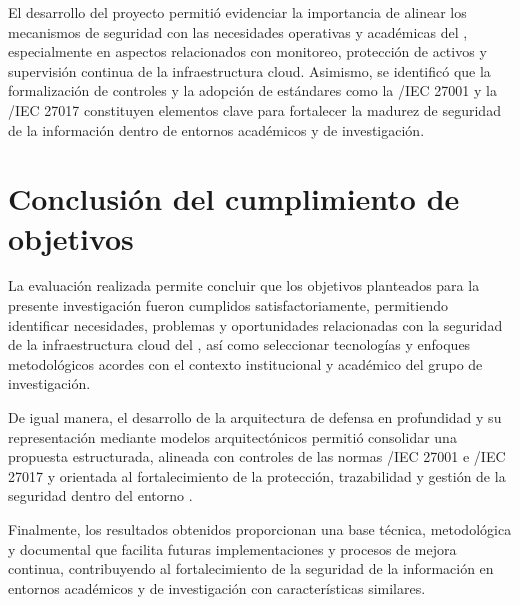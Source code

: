 El desarrollo del proyecto permitió evidenciar la importancia de alinear los mecanismos de seguridad con las necesidades operativas y 
académicas del \GRID, especialmente en aspectos relacionados con monitoreo, protección de activos y supervisión continua de la 
infraestructura cloud. Asimismo, se identificó que la formalización de controles y la adopción de estándares como la \ISO/IEC 27001 y la 
\ISO/IEC 27017 constituyen elementos clave para fortalecer la madurez de seguridad de la información dentro de entornos académicos y de 
investigación.

\section{Conclusión del cumplimiento de objetivos}
\noindent

La evaluación realizada permite concluir que los objetivos planteados para la presente investigación fueron cumplidos satisfactoriamente, 
permitiendo identificar necesidades, problemas y oportunidades relacionadas con la seguridad de la infraestructura cloud del \GRID, así 
como seleccionar tecnologías y enfoques metodológicos acordes con el contexto institucional y académico del grupo de investigación.

De igual manera, el desarrollo de la arquitectura de defensa en profundidad y su representación mediante modelos arquitectónicos permitió 
consolidar una propuesta estructurada, alineada con controles de las normas \ISO/IEC 27001 e \ISO/IEC 27017 y orientada al fortalecimiento 
de la protección, trazabilidad y gestión de la seguridad dentro del entorno \GRID.

Finalmente, los resultados obtenidos proporcionan una base técnica, metodológica y documental que facilita futuras implementaciones y 
procesos de mejora continua, contribuyendo al fortalecimiento de la seguridad de la información en entornos académicos y de investigación 
con características similares.
